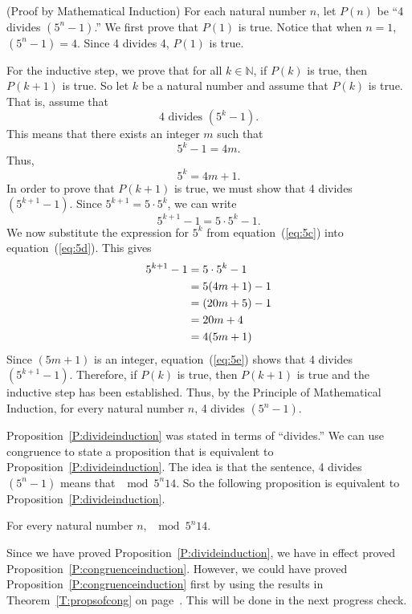 \begin{myproof}(Proof by Mathematical Induction)
For each natural number  $n$, let  $P( n )$ be ``4  divides  $\left( {5^n  - 1} \right)$.'' 
We first prove that $P \left( 1 \right)$ is true.  Notice that when  
$n = 1$, $\left( {5^n  - 1} \right) = 4$.  Since  4  divides 4,  $P\left( 1 \right)$  is true.

For the inductive step, we prove that for all $k \in \mathbb{N}$, if $P \left( k \right)$ is true, then $P \left( k + 1 \right)$ is true.  So let  $k$  be a natural number and assume that  $P(  k )$  is true.  That is, assume that
\[
4\text{  divides  }\left( {5^k  - 1} \right).
\]
This means that there exists an integer  $m$  such that  
\[
5^k  - 1 = 4m.
\]
Thus,
\begin{equation} \label{eq:5c}
5^k  = 4m + 1.
\end{equation}
In order to prove that  $P( k + 1 )$ is true, we must show that  4 divides $\left( {5^{k + 1}  - 1} \right)$.  Since  $5^{k + 1}  = 5 \cdot 5^k $, we can write
\begin{equation} \label{eq:5d}
5^{k + 1}  - 1 = 5 \cdot 5^k  - 1.
\end{equation}
We now substitute the expression for  $5^k $ from equation~(\ref{eq:5c})  into equation~(\ref{eq:5d}).  This gives
%
\begin{align}
  5^{k + 1}  - 1 &= 5 \cdot 5^k  - 1 \notag \\
                 &= 5( {4m + 1} ) - 1 \notag \\ 
                 &= ( {20m + 5} ) - 1 \notag \\ 
                 &= 20m + 4 \notag \\ 
                 &= 4( {5m + 1} ) \label{eq:5e} 
\end{align} 
%
Since  $\left( {5m + 1} \right)$ is an integer, equation~(\ref{eq:5e}) shows that 4 divides $\left( {5^{k + 1}  - 1} \right)$.  Therefore,  if  $P(  k )$ is true, then  $P( k + 1 )$ is true and the inductive step has been established.
Thus, by the Principle of Mathematical Induction, for every natural number  $n$,  4  divides  $\left( {5^n  - 1} \right)$.
\end{myproof}

Proposition~\ref{P:divideinduction} was stated in terms of ``divides.''  We can use congruence to state a proposition that is equivalent to Proposition~\ref{P:divideinduction}.  The idea is that the sentence, 4 divides $\left(5^n - 1 \right)$ means that $\mod{ 5^n }{1}{4}$.  So the following proposition is equivalent to Proposition~\ref{P:divideinduction}.
\begin{proposition} \label{P:congruenceinduction}
For every natural number  $n$,  $\mod{ 5^n }{1}{4}$.
\end{proposition}
Since we have proved Proposition~\ref{P:divideinduction}, we have in effect proved 
Proposition~\ref{P:congruenceinduction}.  However, we could have proved 
Proposition~\ref{P:congruenceinduction} first by using the results in Theorem~\ref{T:propsofcong} on page~\pageref{T:propsofcong}.  This will be done in the next progress check.
\hbreak

